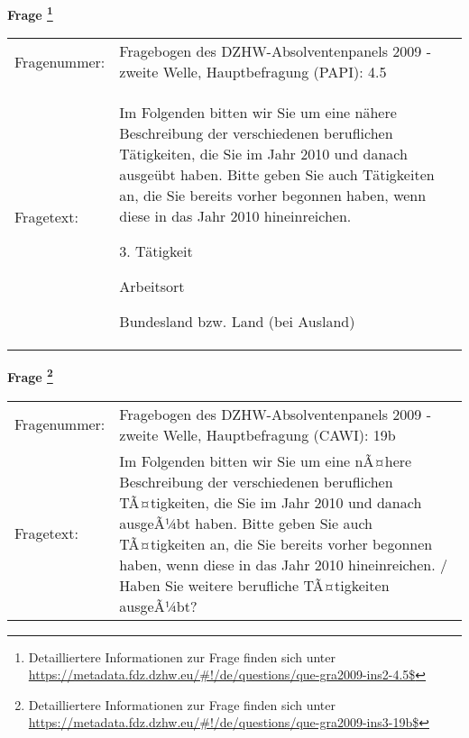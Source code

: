 				\vspace*{0.5cm}
                \noindent\textbf{Frage
	                \footnote{Detailliertere Informationen zur Frage finden sich unter
		              \url{https://metadata.fdz.dzhw.eu/\#!/de/questions/que-gra2009-ins2-4.5$}}}\\
				\begin{tabularx}{\hsize}{@{}lX}
					Fragenummer: &
					  Fragebogen des DZHW-Absolventenpanels 2009 - zweite Welle, Hauptbefragung (PAPI):
					  4.5
 \\
					Fragetext: & Im Folgenden bitten wir Sie um eine nähere Beschreibung der verschiedenen beruflichen Tätigkeiten, die Sie im Jahr 2010 und danach ausgeübt haben. Bitte geben Sie auch Tätigkeiten an, die Sie bereits vorher begonnen haben, wenn diese in das Jahr 2010 hineinreichen.\par  3. Tätigkeit\par  Arbeitsort\par  Bundesland bzw. Land (bei Ausland) \\
				\end{tabularx}
				\vspace*{0.5cm}
                \noindent\textbf{Frage
	                \footnote{Detailliertere Informationen zur Frage finden sich unter
		              \url{https://metadata.fdz.dzhw.eu/\#!/de/questions/que-gra2009-ins3-19b$}}}\\
				\begin{tabularx}{\hsize}{@{}lX}
					Fragenummer: &
					  Fragebogen des DZHW-Absolventenpanels 2009 - zweite Welle, Hauptbefragung (CAWI):
					  19b
 \\
					Fragetext: & Im Folgenden bitten wir Sie um eine nÃ¤here Beschreibung der verschiedenen beruflichen TÃ¤tigkeiten, die Sie im Jahr 2010 und danach ausgeÃ¼bt haben. Bitte geben Sie auch TÃ¤tigkeiten an, die Sie bereits vorher begonnen haben, wenn diese in das Jahr 2010 hineinreichen. / Haben Sie weitere berufliche TÃ¤tigkeiten ausgeÃ¼bt? \\
				\end{tabularx}





